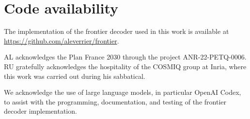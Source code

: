 \documentclass[a4paper,twocolumn,11pt,unpublished]{quantumarticle}
\begin{document}
\section*{Code availability}

The implementation of the frontier decoder used in this work is available at
\url{https://github.com/aleverrier/frontier}.

\begin{acknowledgments}
AL acknowledges the Plan France 2030 through the project ANR-22-PETQ-0006.
RU gratefully acknowledges the hospitality of the COSMIQ group at Inria, where this work was carried out during his sabbatical.

We acknowledge the use of large language models, in particular OpenAI Codex, to assist with the programming, documentation, and testing of the frontier decoder implementation.
\end{acknowledgments}






\end{document}
